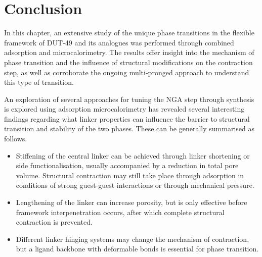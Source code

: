 
\section{Conclusion}

In this chapter, an extensive study of the unique phase transitions
in the flexible framework of DUT-49 and its analogues was performed
through combined adsorption and microcalorimetry.
The results offer insight into the mechanism of phase transition
and the influence of structural modifications on the contraction step,
as well as corroborate the ongoing multi-pronged approach to understand
this type of transition.

An exploration of several approaches for tuning the NGA step through 
synthesis is explored using adsorption microcalorimetry has revealed
several interesting findings regarding what linker properties can
influence the barrier to structural transition and stability of the
two phases. These can be generally summarised as follows.

\begin{itemize}
    \item Stiffening of the central linker can be achieved through 
    linker shortening or side functionalisation, usually accompanied 
    by a reduction in total pore volume. Structural contraction may 
    still take place through adsorption in conditions of strong 
    guest-guest interactions or through mechanical pressure.
    \item Lengthening of the linker can increase porosity,
    but is only effective before framework interpenetration 
    occurs, after which complete structural contraction is 
    prevented.
    \item Different linker hinging systems may change 
    the mechanism of contraction, but a ligand backbone with 
    deformable bonds is essential for phase transition.
\end{itemize}

